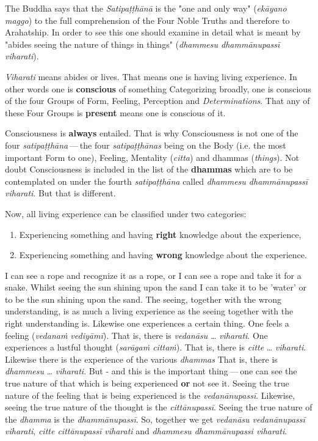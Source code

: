 The Buddha says that the \emph{Satipaṭṭhānā} is the "one and only way" (\emph{ekāyano maggo}) to the full comprehension of the Four Noble Truths and therefore to Arahatship. In order to see this one should examine in detail what is meant by "abides seeing the nature of things in things" (\emph{dhammesu dhammānupassī viharati}).

\emph{Viharati} means abides or lives. That means one is having living experience. In other words one is \textbf{conscious} of something Categorizing broadly, one is conscious of the four Groups of Form, Feeling, Perception and \emph{Determinations}. That any of these Four Groups is \textbf{present} means one is conscious of it.

Consciousness is \textbf{always} entailed. That is why Consciousness is not one of the four \emph{satipaṭṭhāna} --- the four \emph{satipaṭṭhānas} being on the Body (i.e. the most important Form to one), Feeling, Mentality (\emph{citta}) and dhammas (\emph{things}). Not doubt Consciousness is included in the list of the \textbf{dhammas} which are to be contemplated on under the fourth \emph{satipaṭṭhāna} called \emph{dhammesu dhammānupassī viharati}. But that is different.

Now, all living experience can be classified under two categories:

\begin{enumerate}
\def\labelenumi{\arabic{enumi}.}
\item
  Experiencing something and having \textbf{right} knowledge about the experience,
\item
  Experiencing something and having \textbf{wrong} knowledge about the experience.
\end{enumerate}

I can see a rope and recognize it as a rope, or I can see a rope and take it for a snake. Whilst seeing the sun shining upon the sand I can take it to be 'water' or to be the sun shining upon the sand. The seeing, together with the wrong understanding, is as much a living experience as the seeing together with the right understanding is. Likewise one experiences a certain thing. One feels a feeling (\emph{vedanaṁ vediyāmī}). That is, there is \emph{vedanāsu} \ldots\hspace{0pt} \emph{viharati}. One experiences a lustful thought (\emph{sarāgaṁ cittaṁ}). That is, there is \emph{citte} \ldots\hspace{0pt} \emph{viharati}. Likewise there is the experience of the various \emph{dhammas} That is, there is \emph{dhammesu} \ldots\hspace{0pt} \emph{viharati}. But - and this is the important thing --- one can see the true nature of that which is being experienced \textbf{or} not see it. Seeing the true nature of the feeling that is being experienced is the \emph{vedanānupassī}. Likewise, seeing the true nature of the thought is the \emph{cittānupassī}. Seeing the true nature of the \emph{dhamma} is the \emph{dhammānupassī}. So, together we get \emph{vedanāsu vedanānupassī viharati}, \emph{citte cittānupassī viharati} and \emph{dhammesu dhammānupassi viharati}.

